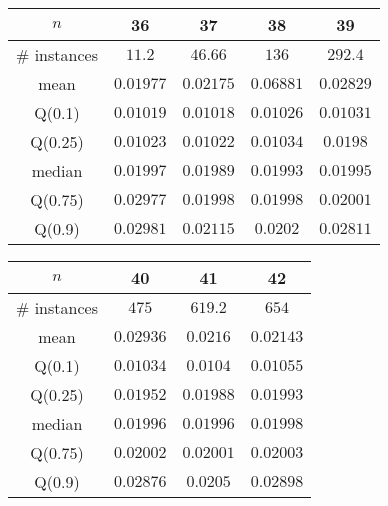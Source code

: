 \begin{tabular}{c|cccc} 
\hline 
$n$ & 36 & 37 & 38 & 39 \tabularnewline 
\hline 
\hline 
\# instances & $11.2$ & $46.66$ & $136$ & $292.4$ \tabularnewline 
mean & $0.01977$ & $0.02175$ & $0.06881$ & $0.02829$ \tabularnewline 
Q(0.1) & $0.01019$ & $0.01018$ & $0.01026$ & $0.01031$ \tabularnewline 
Q(0.25) & $0.01023$ & $0.01022$ & $0.01034$ & $0.0198$ \tabularnewline 
median & $0.01997$ & $0.01989$ & $0.01993$ & $0.01995$ \tabularnewline 
Q(0.75) & $0.02977$ & $0.01998$ & $0.01998$ & $0.02001$ \tabularnewline 
Q(0.9) & $0.02981$ & $0.02115$ & $0.0202$ & $0.02811$ \tabularnewline 
\hline 
\end{tabular} 
\medskip{} 

\begin{tabular}{c|ccc} 
\hline 
$n$ & 40 & 41 & 42 \tabularnewline 
\hline 
\hline 
\# instances & $475$ & $619.2$ & $654$ \tabularnewline 
mean & $0.02936$ & $0.0216$ & $0.02143$ \tabularnewline 
Q(0.1) & $0.01034$ & $0.0104$ & $0.01055$ \tabularnewline 
Q(0.25) & $0.01952$ & $0.01988$ & $0.01993$ \tabularnewline 
median & $0.01996$ & $0.01996$ & $0.01998$ \tabularnewline 
Q(0.75) & $0.02002$ & $0.02001$ & $0.02003$ \tabularnewline 
Q(0.9) & $0.02876$ & $0.0205$ & $0.02898$ \tabularnewline 
\hline 
\end{tabular} 
\medskip{} 

